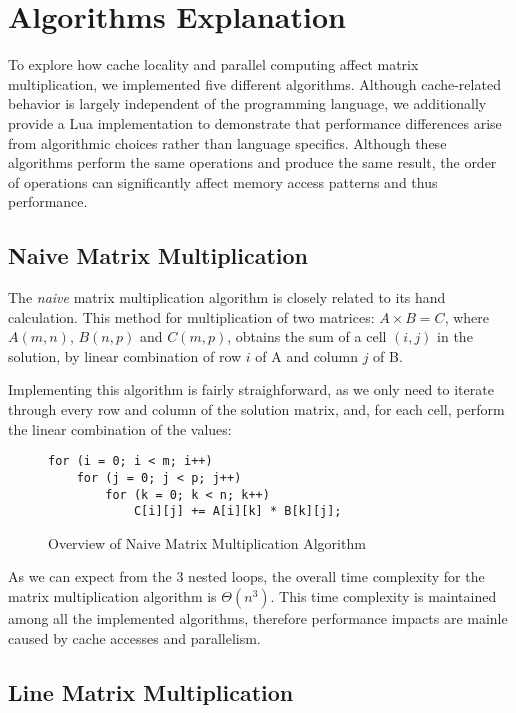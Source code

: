 \section{Algorithms Explanation} \label{section:algorithms}

To explore how cache locality and parallel computing affect matrix multiplication, we implemented five different algorithms. Although cache-related behavior is largely independent of the programming language, we additionally provide a Lua implementation to demonstrate that performance differences arise from algorithmic choices rather than language specifics. Although these algorithms perform the same operations and produce the same result, the order of operations can significantly affect memory access patterns and thus performance.

\subsection{Naive Matrix Multiplication}

The \textit{naive} matrix multiplication algorithm is closely related to its hand calculation. This method for multiplication of two matrices: $A \times B = C$, where $A(m, n)$, $B(n, p)$ and $C(m, p)$, obtains the sum of a cell $(i,j)$ in the solution, by linear combination of row $i$ of A and column $j$ of B.

Implementing this algorithm is fairly straighforward, as we only need to iterate through every row and column of the solution matrix, and, for each cell, perform the linear combination of the values:

\begin{figure}[ht!]
\begin{verbatim}
for (i = 0; i < m; i++)
    for (j = 0; j < p; j++)
        for (k = 0; k < n; k++)
            C[i][j] += A[i][k] * B[k][j];
\end{verbatim}
\caption{Overview of Naive Matrix Multiplication Algorithm}
\label{fig:algo:naive}
\end{figure}

As we can expect from the 3 nested loops, the overall time complexity for the matrix multiplication algorithm is $Θ(n^3)$. This time complexity is maintained among all the implemented algorithms, therefore performance impacts are mainle caused by cache accesses and parallelism.

\subsection{Line Matrix Multiplication}

